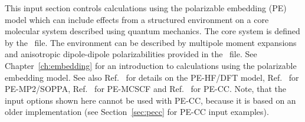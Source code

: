 This input section controls calculations using the polarizable
embedding (PE) model\cite{pemodel1,pemodel2} which can include effects from a structured
environment on a core molecular system described using quantum mechanics.
The core system is defined by the \molinp\ file.
The environment can be described by multipole moment expansions
and anisotropic dipole-dipole polarizabilities provided in the \potinp\
file. See Chapter~\ref{ch:embedding} for an introduction to
calculations using the polarizable embedding model. See also Ref.~\cite{pescf} for
details on the PE-HF/DFT model, Ref.~\cite{pesoppa} for PE-MP2/SOPPA,
Ref.~\cite{pemcscf} for PE-MCSCF and Ref.~\cite{pecc} for PE-CC. Note, that the input
options shown here cannot be used with PE-CC, because it is based on an older
implementation (see Section~\ref{sec:pecc} for PE-CC input examples).


